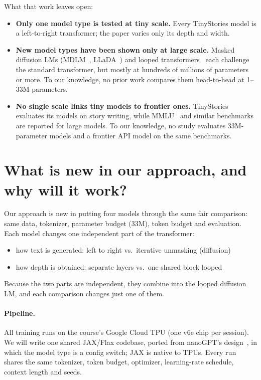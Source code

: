 \documentclass[11pt]{article}
\begin{document}
What that work leaves open:

\begin{itemize}
  \item \textbf{Only one model type is tested at tiny scale.} Every TinyStories model is a left-to-right transformer; the paper varies only its depth and width.
  \item \textbf{New model types have been shown only at large scale.} Masked diffusion LMs (MDLM~\cite{mdlm}, LLaDA~\cite{llada}) and looped transformers~\cite{universal,looped} each challenge the standard transformer, but mostly at hundreds of millions of parameters or more. To our knowledge, no prior work compares them head-to-head at 1--33M parameters.
  \item \textbf{No single scale links tiny models to frontier ones.} TinyStories evaluates its models on story writing, while MMLU~\cite{mmlu} and similar benchmarks are reported for large models. To our knowledge, no study evaluates 33M-parameter models and a frontier API model on the same benchmarks.
\end{itemize}

\section{What is new in our approach, and why will it work?}

Our approach is new in putting four models through the same fair comparison: same data, tokenizer, parameter budget (33M), token budget and evaluation. Each model changes one independent part of the transformer:

\begin{itemize}
  \item how text is generated: left to right vs.\ iterative unmasking (diffusion)
  \item how depth is obtained: separate layers vs.\ one shared block looped
\end{itemize}

Because the two parts are independent, they combine into the looped diffusion LM, and each comparison changes just one of them.

\paragraph{Pipeline.} All training runs on the course's Google Cloud TPU (one v6e chip per session). We will write one shared JAX/Flax codebase, ported from nanoGPT's design~\cite{nanogpt}, in which the model type is a config switch; JAX is native to TPUs. Every run shares the same tokenizer, token budget, optimizer, learning-rate schedule, context length and seeds.
\end{document}
